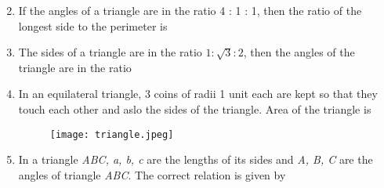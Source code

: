 \documentclass[journal,12pt,twocolumn]{IEEEtran}
\begin{document}
\begin{enumerate}
\begin{itemize}
\begin{multicols}{2}
 \end{multicols}
 \end{itemize}
 \item If the angles of a triangle are in the ratio 4 : 1 : 1, then the ratio of the longest side to the perimeter is
 \begin{itemize}
 \end{itemize}
 \item The sides of a triangle are in the ratio $1 : \sqrt{3} : 2$, then the angles of the triangle are in the ratio
 \begin{itemize}
 \end{itemize}   
 \item In an equilateral triangle, 3 coins of radii 1 unit each are kept so that they touch each other and aslo the sides of the triangle. Area of the triangle is
 \begin{figure}[h!]
 \begin{center}
 \texttt{[image: triangle.jpeg]}
 \end{center}
 \end{figure}  
 \begin{itemize}
 \end{itemize}
 \item In a triangle \textsl{ABC, a, b, c} are the lengths of its sides and \textsl{A, B, C} are the angles of triangle \textsl{ABC}. The correct relation is given by

\end{enumerate}
\end{document}
